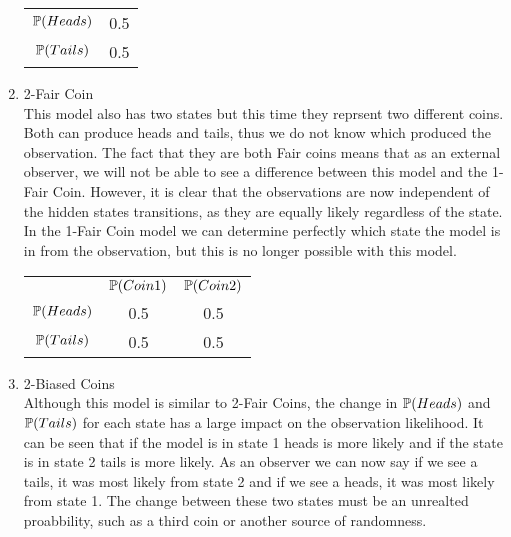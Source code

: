 \begin{example}
\begin{enumerate}
\begin{center}
			\begin{tabular}{c c}
		 		$\mathbb{P} (Heads)$  & 0.5 \\
		 		$\mathbb{P} (Tails)$  & 0.5  \\  
			\end{tabular}
		\end{center}
		\item 2-Fair Coin \\ This model also has two states but this time they reprsent two different coins. Both can produce heads and tails, thus we do not know which produced the observation. The fact that they are both Fair coins means that as an external observer, we will not be able to see a difference between this model and the 1-Fair Coin. However, it is clear that the observations are now independent of the hidden states transitions, as they are equally likely regardless of the state. In the 1-Fair Coin model we can determine perfectly which state the model is in from the observation, but this is no longer possible with this model.
		\begin{center}
	
			\begin{tabular}{c c c}
				& $\mathbb{P} (Coin 1)$ & $\mathbb{P} (Coin 2)$ \\
		 		$\mathbb{P} (Heads)$  & 0.5   & 0.5 \\
		 		$\mathbb{P} (Tails)$  & 0.5   & 0.5 \\
			\end{tabular}
		\end{center}
		\item  2-Biased Coins \\ Although this model is similar to 2-Fair Coins, the change in $\mathbb{P} (Heads)$ and $\mathbb{P} (Tails)$ for each state has a large impact on the observation likelihood. It can be seen that if the model is in state 1 heads is more likely and if the state is in state 2 tails is more likely. As an observer we can now say if we see a tails, it was most likely from state 2 and if we see a heads, it was most likely from state 1. The change between these two states must be an unrealted proabbility, such as a third coin or another source of randomness.
		\begin{center}
\end{center}
\end{enumerate}
\end{example}
